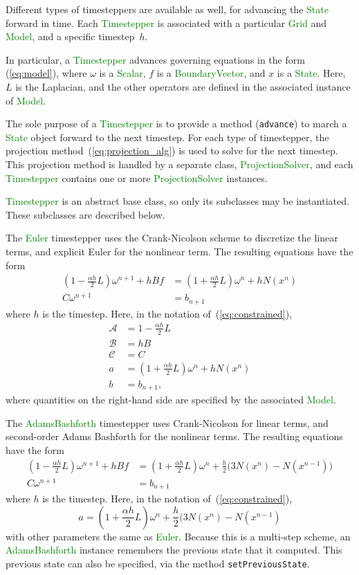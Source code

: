 \documentclass[11pt]{article}
\def\class#1{\textcolor{green}{\bf #1}}
\def\class#1{\textcolor{green}{\ttfamily\small #1}} %
\begin{document}
Different types of timesteppers are available as well, for advancing the \class{State} forward in time.  Each \class{Timestepper} is associated with a particular \class{Grid} and \class{Model}, and a specific timestep~$h$.

In particular, a \class{Timestepper} advances governing equations in the form
(\ref{eq:model}), where $\omega$ is a \class{Scalar}, $f$ is a \class{BoundaryVector}, and $x$ is a \class{State}.  Here, $L$ is the Laplacian, and the other operators are defined in the associated instance of \class{Model}.

The sole purpose of a \class{Timestepper} is to provide a method ({\tt advance}) to march a \class{State} object forward to the next timestep.  For each type of timestepper, the projection method~(\ref{eq:projection_alg}) is used to solve for the next timestep.  This projection method is handled by a separate class, \class{ProjectionSolver}, and each \class{Timestepper} contains one or more \class{ProjectionSolver} instances.

\class{Timestepper} is an abstract base class, so only its subclasses may be instantiated.  These subclasses are described below.  

The \class{Euler} timestepper uses the Crank-Nicolson scheme to discretize the linear terms, and explicit Euler for the nonlinear term.  The resulting equations have the form
	\begin{align}
		(1-\frac{\alpha h}{2}L)\omega^{n+1} + hBf &= (1 + \frac{\alpha h}{2}L)\omega^n + h N(x^n)\\
		C\omega^{n+1} &= b_{n+1}
	\end{align}
where $h$ is the timestep.  Here, in the notation of~(\ref{eq:constrained}),
\begin{align}
	\mathcal{A} &= 1-\frac{\alpha h}{2} L\\
	\mathcal{B} &= hB\\
	\mathcal{C} &= C\\
	a &= (1+\frac{\alpha h}{2}L)\omega^n + hN(x^n)\\
	b &= b_{n+1},
\end{align}
where quantities on the right-hand side are specified by the associated \class{Model}.


The \class{AdamsBashforth} timestepper uses Crank-Nicolson for linear terms, and second-order Adams Bashforth for the nonlinear terms.  The resulting equations have the form
	\begin{align}
		(1-\frac{\alpha h}{2}L)\omega^{n+1} + hBf &= (1 + \frac{\alpha h}{2}L)\omega^n + \frac{h}{2} \big(3N(x^n) - N(x^{n-1})\big)\\
		C\omega^{n+1} &= b_{n+1}
	\end{align}
where $h$ is the timestep.  Here, in the notation of~(\ref{eq:constrained}),
\begin{equation}
	a = (1+\frac{\alpha h}{2}L)\omega^n + \frac{h}{2}(3N(x^n) - N(x^{n-1})
\end{equation}
with other parameters the same as \class{Euler}.  Because this is a multi-step scheme, an \class{AdamsBashforth} instance remembers the previous state that it computed.  This previous state can also be specified, via the method {\tt setPreviousState}.
\end{document}
